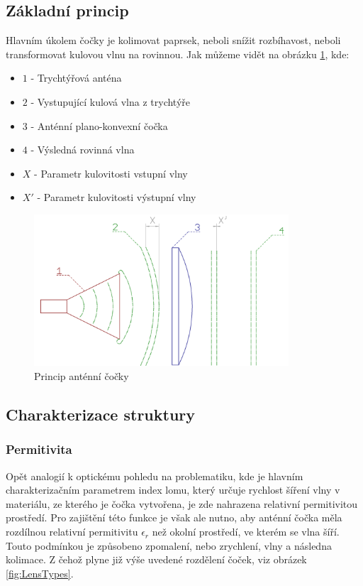 \subsection{Základní princip}
Hlavním úkolem čočky je kolimovat paprsek, neboli snížit rozbíhavost, neboli transformovat kulovou vlnu na rovinnou. Jak můžeme vidět na obrázku \ref{fig:hornLens}, kde:
\begin{itemize}
\item $1$ - Trychtýřová anténa
\item $2$ - Vystupující kulová vlna z trychtýře
\item $3$ - Anténní plano-konvexní čočka
\item $4$ - Výsledná rovinná vlna
\item $X$ - Parametr kulovitosti vstupní vlny
\item $X'$ - Parametr kulovitosti výstupní vlny
\end{itemize}
\begin{figure}[!htbp]
\begin{center}
\includegraphics[width=9.5cm]{pics/lens}
\caption{Princip anténní čočky}
\label{fig:hornLens}
\end{center}
\end{figure}

\subsection{Charakterizace struktury}

\subsubsection{Permitivita}
Opět analogií k optickému pohledu na problematiku, kde je hlavním charakterizačním parametrem index lomu, který určuje rychlost šíření vlny v materiálu, ze kterého je čočka vytvořena, je zde nahrazena relativní permitivitou prostředí. Pro zajištění této funkce je však ale nutno, aby anténní čočka měla rozdílnou relativní permitivitu $\epsilon_r$ než okolní prostředí, ve kterém se vlna šíří. Touto podmínkou je způsobeno zpomalení, nebo zrychlení, vlny a následna kolimace. Z čehož plyne již výše uvedené rozdělení čoček, viz obrázek \ref{fig:LensTypes}.

